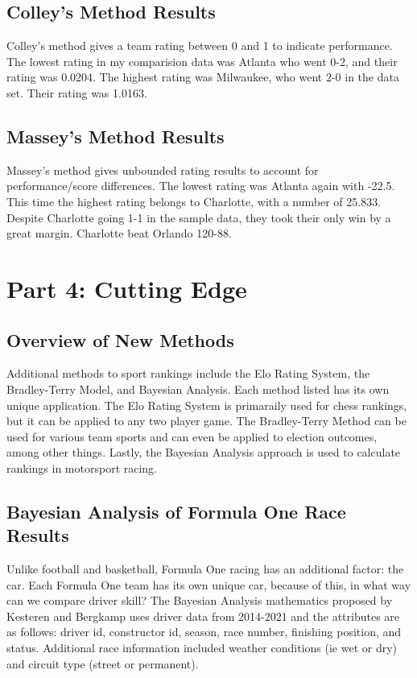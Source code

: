 \documentclass[12pt]{article}
\begin{document}
\subsection{Colley's Method Results}
Colley's method gives a team rating between 0 and 1 to indicate performance. 
The lowest rating in my comparision data was Atlanta who went 0-2, and their rating 
was 0.0204. The highest rating was Milwaukee, who went 2-0 in the data set. 
Their rating was 1.0163.

\subsection{Massey's Method Results}
Massey's method gives unbounded rating results to account for performance/score 
differences. The lowest rating was Atlanta again with -22.5. This time the 
highest rating belongs to Charlotte, with a number of 25.833. Despite Charlotte going 1-1 
in the sample data, they took their only win by a great margin. Charlotte beat 
Orlando 120-88.

\section{Part 4: Cutting Edge}
\subsection{Overview of New Methods}
Additional methods to sport rankings include the Elo Rating System, the Bradley-Terry Model,
and Bayesian Analysis. Each method listed has its own unique application. The Elo Rating System 
is primaraily used for chess rankings, but it can be applied to any two player game. 
The Bradley-Terry Method can be used for various team sports and can even be applied to 
election outcomes, among other things. Lastly, the Bayesian Analysis approach is used 
to calculate rankings in motorsport racing.

\subsection{Bayesian Analysis of Formula One Race Results}
Unlike football and basketball, Formula One racing has an additional factor: the car.
Each Formula One team has its own unique car, because of this, in what way can we compare
driver skill? The Bayesian Analysis mathematics proposed by Kesteren and Bergkamp uses driver data 
from 2014-2021 and the attributes are as follows: driver id, constructor id, season, race number, 
finishing position, and status. Additional race information included weather conditions (ie wet 
or dry) and circuit type (street or permanent).
\end{document}
